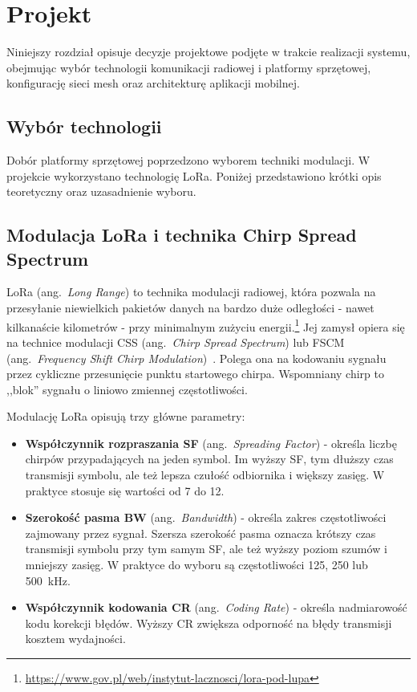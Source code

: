 \newpage
\section{Projekt}

Niniejszy rozdział opisuje decyzje projektowe podjęte w trakcie realizacji systemu,
obejmując wybór technologii komunikacji radiowej i platformy sprzętowej, konfigurację
sieci mesh oraz architekturę aplikacji mobilnej.

\subsection*{Wybór technologii}

Dobór platformy sprzętowej poprzedzono wyborem techniki modulacji. W projekcie wykorzystano technologię
LoRa. Poniżej przedstawiono krótki opis teoretyczny oraz uzasadnienie wyboru.

\subsection*{Modulacja LoRa i technika Chirp Spread Spectrum}

LoRa (ang.\ \textit{Long Range}) to technika modulacji radiowej, która pozwala na przesyłanie
niewielkich pakietów danych na bardzo duże odległości - nawet kilkanaście kilometrów - przy
minimalnym zużyciu energii.\footnote{\url{https://www.gov.pl/web/instytut-lacznosci/lora-pod-lupa}}
Jej zamysł opiera się na technice modulacji CSS (ang.\ \textit{Chirp Spread Spectrum}) lub FSCM
(ang.\ \textit{Frequency Shift Chirp Modulation})~\cite{vangelista2017lora}. Polega ona na
kodowaniu sygnału przez cykliczne przesunięcie punktu startowego chirpa. Wspomniany chirp to
,,blok'' sygnału o liniowo zmiennej częstotliwości.

Modulację LoRa opisują trzy główne parametry:
\begin{itemize}
    \item \textbf{Współczynnik rozpraszania SF} (ang.\ \textit{Spreading Factor}) - określa
          liczbę chirpów przypadających na jeden symbol. Im wyższy SF, tym dłuższy czas transmisji
          symbolu, ale też lepsza czułość odbiornika i większy zasięg. W praktyce stosuje się
          wartości od 7 do 12.

    \item \textbf{Szerokość pasma BW} (ang.\ \textit{Bandwidth}) - określa zakres częstotliwości
          zajmowany przez sygnał. Szersza szerokość pasma oznacza krótszy czas transmisji symbolu
          przy tym samym SF, ale też wyższy poziom szumów i mniejszy zasięg. W praktyce do wyboru
          są częstotliwości 125, 250 lub 500~kHz.

    \item \textbf{Współczynnik kodowania CR} (ang.\ \textit{Coding Rate}) - określa nadmiarowość
          kodu korekcji błędów. Wyższy CR zwiększa odporność na błędy transmisji kosztem wydajności.
\end{itemize}

